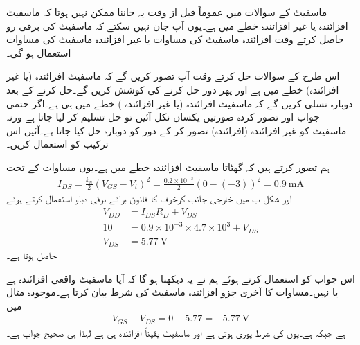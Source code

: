 ماسفیٹ کے سوالات میں عموماً قبل از وقت یہ جاننا ممکن نہیں ہوتا کہ ماسفیٹ افزائندہ یا غیر افزائندہ خطے میں ہے۔یوں آپ جان نہیں سکتے کہ ماسفیٹ کی برقی رو حاصل کرتے وقت افزائندہ ماسفیٹ کی مساوات یا غیر افزائندہ ماسفیٹ کی مساوات استعمال ہو گی۔

اس طرح کے سوالات حل کرتے وقت آپ تصور کریں گے کہ ماسفیٹ افزائندہ (یا غیر افزائندہ) خطے میں ہے اور پھر دور حل کرنے کی کوشش کریں گے۔حل کرنے کے بعد دوبارہ تسلی کریں گے کہ ماسفیٹ افزائندہ (یا غیر افزائندہ ) خطے میں ہی ہے۔اگر حتمی جواب اور تصور کردہ صورتیں یکساں نکل آئیں تو حل تسلیم کر لیا جاتا ہے ورنہ ماسفیٹ کو غیر افزائندہ (افزائندہ) تصور کر کے دور کو دوبارہ حل کیا جاتا ہے۔آئیں اس ترکیب کو استعمال کریں۔

ہم تصور کرتے ہیں کہ گھٹاتا ماسفیٹ افزائندہ خطے میں ہے۔یوں مساوات   کے تحت
\begin{align*}
I_{DS}=\frac{k_n}{2} \left(V_{GS}-V_t \right )^{2}=\frac{0.2 \times 10^{-3}}{2} \left(0-(-3) \right )^2 =\SI{0.9}{\milli \ampere}
\end{align*}
اور شکل  ب میں خارجی جانب کرخوف کا قانون برائے برقی دباو استعمال کرتے ہوئے
\begin{align*}
V_{DD}&=I_{DS} R_D+V_{DS}\\
10&=0.9 \times 10^{-3} \times 4.7 \times 10^{3}+V_{DS}\\
V_{DS}&=\SI{5.77}{\volt}
\end{align*}
حاصل ہوتا ہے۔

اس جواب کو استعمال کرتے ہوئے ہم نے یہ دیکھنا ہو گا کہ آیا ماسفیٹ واقعی افزائندہ ہے یا نہیں۔مساوات   کا آخری جزو افزائندہ ماسفیٹ کی شرط بیان کرتا ہے۔موجودہ مثال میں
\begin{align*}
V_{GS}-V_{DS}=0-5.77=\SI{-5.77}{\volt}
\end{align*}
ہے جبکہ   ہے۔یوں   کی شرط پوری ہوتی ہے اور ماسفیٹ یقیناً افزائندہ ہی ہے لہٰذا  ہی صحیح جواب ہے۔

